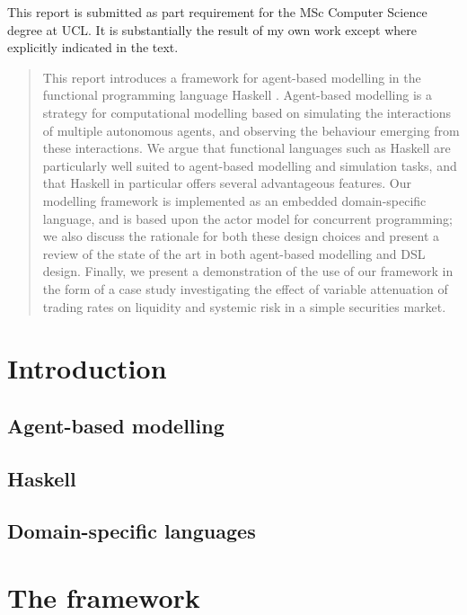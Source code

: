 \documentclass[a4paper, 11pt]{article}
\let\stdsection\section
\renewcommand\section{\newpage\stdsection}
\begin{document}
\maketitle
\begin{center}
\footnotesize This report is submitted as part requirement for the MSc Computer Science
degree at UCL. It is substantially the result of my own work except where explicitly indicated in the text.
\end{center}

\begin{abstract}
This report introduces a framework for agent-based modelling in the functional programming language Haskell \cite{Jones2003}.
Agent-based modelling \cite{Holland1991} is a strategy for computational modelling based on simulating the interactions of multiple autonomous agents, and observing the behaviour emerging from these interactions. We argue that functional languages such as Haskell are particularly well suited to agent-based modelling and simulation tasks, and that Haskell in particular offers several advantageous features. Our modelling framework is implemented as an embedded domain-specific language, and is based upon the actor model \cite{Agha1985} for concurrent programming; we also discuss the rationale for both these design choices and present a review of the state of the art in both agent-based modelling and DSL design. Finally, we present a demonstration of the use of our framework in the form of a case study investigating the effect of variable attenuation of trading rates on liquidity and systemic risk in a simple securities market.
\end{abstract}
\tableofcontents
\section{Introduction}
\subsection{Agent-based modelling}
\subsection{Haskell}
\subsection{Domain-specific languages}
\section{The framework}
\end{document}
